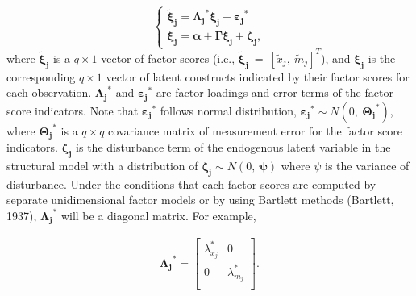 \documentclass[
  man]{apa6}
\begin{document}
\begin{equation}
    \begin{cases}
      \boldsymbol{\tilde{\xi}_{j}} = \boldsymbol{\Lambda_{j}}^\text{*}\boldsymbol{\xi_{j}} + \boldsymbol{\varepsilon_{j}}^\text{*} \\
      \boldsymbol{\xi_{j}} = \boldsymbol{\alpha} + \boldsymbol{\Gamma}\boldsymbol{\xi_{j}} + \boldsymbol{\zeta_{j}}, 
    \end{cases}       
\end{equation}
where \(\boldsymbol{\tilde{\xi}_{j}}\) is a \(q \times 1\) vector of factor scores (i.e., \(\boldsymbol{\tilde{\xi}_{j}} \ = \ [\tilde{x}_{j}, \ \tilde{m}_{j}]^T\)), and \(\boldsymbol{\xi_{j}}\) is the corresponding \(q \times 1\) vector of latent constructs indicated by their factor scores for each observation. \(\boldsymbol{\Lambda_{j}}^\text{*}\) and \(\boldsymbol{\varepsilon_{j}}^\text{*}\) are factor loadings and error terms of the factor score indicators. Note that \(\boldsymbol{\varepsilon_{j}}^\text{*}\) follows normal distribution, \(\boldsymbol{\varepsilon_{j}}^\text{*} \sim N(0, \ \boldsymbol{\Theta_{j}}^\text{*})\), where \(\boldsymbol{\Theta_{j}}^\text{*}\) is a \(q \times q\) covariance matrix of measurement error for the factor score indicators. \(\boldsymbol{\zeta_{j}}\) is the disturbance term of the endogenous latent variable in the structural model with a distribution of \(\boldsymbol{\zeta_{j}} \sim N(0, \ \boldsymbol{\psi})\) where \(\psi\) is the variance of disturbance. Under the conditions that each factor scores are computed by separate unidimensional factor models or by using Bartlett methods (Bartlett, 1937), \(\boldsymbol{\Lambda_{j}}^\text{*}\) will be a diagonal matrix. For example,

\begin{align}
\boldsymbol{\Lambda_{j}}^\text{*} = 
    \begin{bmatrix}
        \lambda_{x_{j}}^\text{*} & 0 \\
        0 & \lambda_{m_{j}}^\text{*} \\ 
    \end{bmatrix}.
\end{align}
\end{document}
